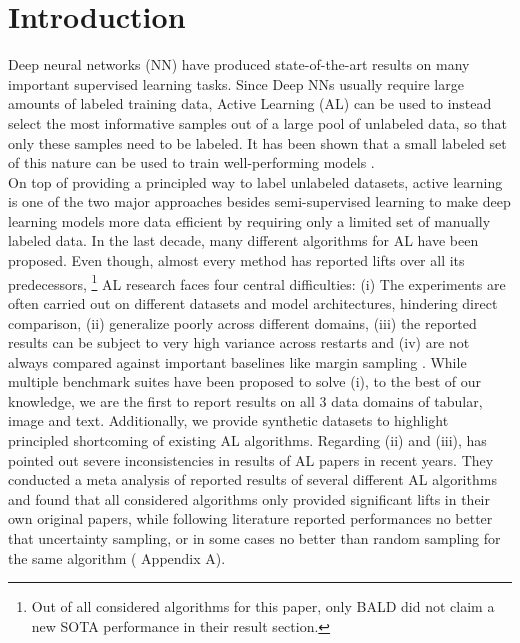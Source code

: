 \documentclass[]{article}
\begin{document}
\section{Introduction}
Deep neural networks (NN) have produced state-of-the-art results on many important supervised learning tasks.
Since Deep NNs usually require large amounts of labeled training data, Active Learning (AL) can be used to instead select the most informative samples out of a large pool of unlabeled data, so that only these samples need to be labeled.
It has been shown that a small labeled set of this nature can be used to train well-performing models \cite{beck2021effective, hu2021towards, li2022empirical, zhou2021towards}. \\
On top of providing a principled way to label unlabeled datasets, active learning is one of the two major approaches besides semi-supervised learning to make deep learning models more data efficient by requiring only a limited set of manually labeled data.
In the last decade, many different algorithms for AL have been proposed.
Even though, almost every method has reported lifts over all its predecessors,
\footnote{Out of all considered algorithms for this paper, only BALD \cite{gal2017deep} did not claim a new SOTA performance in their result section.}
AL research faces four central difficulties:
{\let\thefootnote\relax{}}
(i) The experiments are often carried out on different datasets and model architectures, hindering direct comparison,
(ii) generalize poorly across different domains,
(iii) the reported results can be subject to very high variance across restarts and
(iv) are not always compared against important baselines like margin sampling \cite{wang2014new}.
While multiple benchmark suites have been proposed to solve (i), to the best of our knowledge, we are the first to report results on all 3 data domains of tabular, image and text.
Additionally, we provide synthetic datasets to highlight principled shortcoming of existing AL algorithms.
Regarding (ii) and (iii), \cite{zhou2021towards} has pointed out severe inconsistencies in results of AL papers in recent years. 
They conducted a meta analysis of reported results of several different AL algorithms and found that all considered algorithms only provided significant lifts in their own original papers, while following literature reported performances no better that uncertainty sampling, or in some cases no better than random sampling for the same algorithm (\cite{zhou2021towards} Appendix A).
\end{document}
